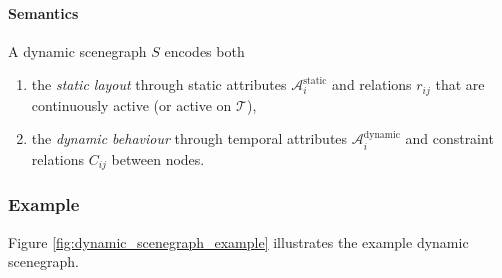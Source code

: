 \documentclass{article}
\begin{document}
\paragraph{Semantics}  
A dynamic scenegraph $S$ encodes both
\begin{enumerate}
    \item the \emph{static layout} through static attributes $\mathcal{A}_i^{\mathrm{static}}$ and relations $r_{ij}$ that are continuously active (or active on $\mathcal{T}$),
    \item the \emph{dynamic behaviour} through temporal attributes $\mathcal{A}_i^{\mathrm{dynamic}}$ and constraint relations $C_{ij}$ between nodes.
\end{enumerate}

\subsubsection*{Example}
Figure \ref{fig:dynamic_scenegraph_example} illustrates the example dynamic scenegraph.
\end{document}
